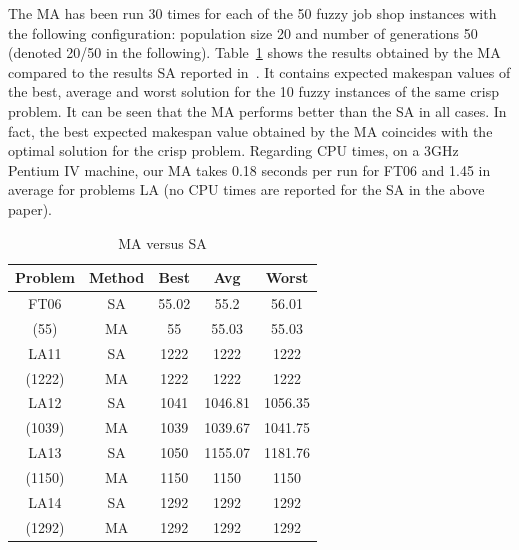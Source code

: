 \documentclass[letterpaper]{article}
\begin{document}
The MA has been run 30 times for each of the 50 fuzzy job shop instances with the following configuration: population size 20 and number of generations 50 (denoted 20/50 in the following). Table~\ref{tabMAvsFortemps} shows the results obtained by the MA compared to the results SA reported in~\cite{Fortemps1997}. It contains expected makespan values of the best, average and worst solution for the 10 fuzzy instances of the same crisp problem. It can be seen that the MA performs better than the SA in all cases. In fact, the best expected makespan value obtained by the MA coincides with the optimal solution for the crisp problem. Regarding CPU times, on a 3GHz Pentium IV machine, our MA takes 0.18 seconds per run for FT06 and 1.45 in average for problems LA (no CPU times are reported for the SA in the above paper).
\begin{table}[htb]
\caption{\label{tabMAvsFortemps}MA versus SA}
\centering
\begin{tabular}{c|c|ccc}
\hline\hline
Problem & Method & Best & Avg & Worst \\
\hline\hline
 FT06 & SA &  55.02 & 55.2 & 56.01 \\
  (55)& MA &  55 & 55.03 & 55.03 \\
  \hline
 LA11 & SA &  1222 & 1222 & 1222 \\
 (1222) & MA &  1222 & 1222 & 1222\\
  \hline
 LA12 & SA &  1041 & 1046.81 & 1056.35 \\
 (1039) & MA & 1039 & 1039.67 & 1041.75\\
  \hline
 LA13 & SA &  1050 & 1155.07 & 1181.76 \\
 (1150) & MA & 1150 & 1150 & 1150\\
  \hline
 LA14 & SA &  1292 & 1292 & 1292 \\
 (1292) & MA & 1292 & 1292 & 1292\\
 \hline\hline
\end{tabular}
\end{table}
\end{document}
